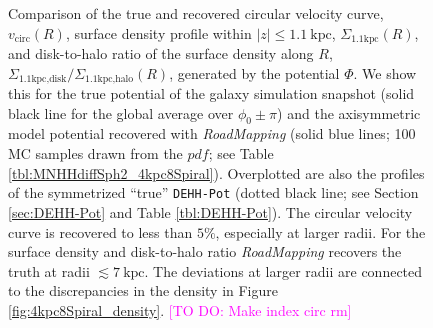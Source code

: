 \documentclass[iop,revtex4,numberedappendix,appendixfloats]{emulateapj}
\newcommand{\RM}{{\sl RoadMapping}}
\newcommand{\Wilma}[1]{\textcolor{Magenta}{#1}}
\begin{document}
\begin{figure}[!htbp]
\centering
\caption{Comparison of the true and recovered circular velocity curve, $v_\text{circ}(R)$, surface density profile within $|z|\leq1.1~\text{kpc}$, $\Sigma_\text{1.1kpc}(R)$, and disk-to-halo ratio of the surface density along $R$, $\Sigma_\text{1.1kpc,disk}/\Sigma_\text{1.1kpc,halo}(R)$, generated by the potential $\Phi$. We show this for the true potential of the galaxy simulation snapshot (solid black line for the global average over $\phi_0\pm\pi$) and the axisymmetric model potential recovered with \RM{} (solid blue lines; 100 MC samples drawn from the $pdf$; see Table \ref{tbl:MNHHdiffSph2_4kpc8Spiral}). Overplotted are also the profiles of the symmetrized ``true'' \texttt{DEHH-Pot} (dotted black line; see Section \ref{sec:DEHH-Pot} and Table \ref{tbl:DEHH-Pot}). The circular velocity curve is recovered to less than $5\%$, especially at larger radii. For the surface density and disk-to-halo ratio \RM{} recovers the truth at radii $\lesssim 7~\text{kpc}$. The deviations at larger radii are connected to the discrepancies in the density in Figure \ref{fig:4kpc8Spiral_density}. \Wilma{[TO DO: Make index circ rm]}}
\label{fig:4kpc8Spiral_vcirc_surfdens}
\end{figure}
\end{document}
